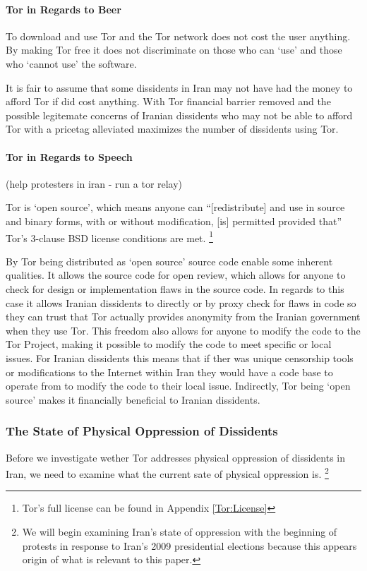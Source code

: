 \documentclass[11pt]{article}
\begin{document}
\begin{multicols}{2}
\paragraph{Tor in Regards to Beer}

To download and use Tor and the Tor network does not cost the user anything. By
making Tor free it does not discriminate on those who can `use' and those who
`cannot use' the software. 

It is fair to assume that some dissidents in Iran may not have had the money to
afford Tor if did cost anything. With Tor financial barrier removed and the
possible legitemate concerns of Iranian dissidents who may not be able to afford
Tor with a pricetag alleviated maximizes the number of dissidents using Tor.

\paragraph{Tor in Regards to Speech}
(help protesters in iran - run a tor relay)

Tor is `open source', which means anyone can ``[redistribute] and use in source
and binary forms, with or without modification, [is] permitted provided that''
Tor's 3-clause BSD license conditions are met. \footnote{Tor's full license can
be found in Appendix \ref{Tor:License}} \cite{BSD:3-ClauseLicense,
TOR:Download, TOR:BSD-License} 

By Tor being distributed as `open source' source code enable some inherent
qualities. It allows the source code for open review, which allows for anyone to
check for design or implementation flaws in the source code. In regards to this
case it allows Iranian dissidents to directly or by proxy check for flaws in
code so they can trust that Tor actually provides anonymity from the Iranian
government when they use Tor. This freedom also allows for anyone to modify the
code to the Tor Project, making it possible to modify the code to meet specific
or local issues. For Iranian dissidents this means that if ther was unique
censorship tools or modifications to the Internet within Iran they would have a
code base to operate from to modify the code to their local issue.  Indirectly,
Tor being `open source' makes it financially beneficial to Iranian dissidents.

\subsubsection{The State of Physical Oppression of Dissidents}
Before we investigate wether Tor addresses physical oppression of dissidents in
Iran, we need to examine what the current sate of physical oppression is.
\footnote{We will begin examining Iran's state of oppression with the beginning
of protests in response to Iran's 2009 presidential elections because this
appears origin of what is relevant to this paper.}


\end{multicols}
\end{document}
